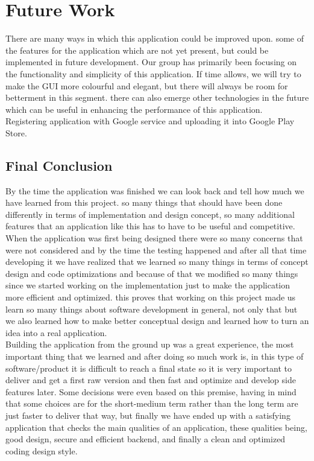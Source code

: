 \section{Future Work}
There are many ways in which this application could be improved upon. some of the features for the application which are not yet present, but could be implemented in future development.
Our group has primarily been focusing on the functionality and simplicity of this application. If time allows, we will try to make the GUI more colourful and elegant, but there will always be room for betterment in this segment. there can also emerge other technologies in the future which can be useful in enhancing the performance of this application.\\
Registering application with Google service and uploading it into Google Play Store.  

\begin{center}
    \section*{\huge{Final Conclusion}}
\end{center}
By the time the application was finished we can look back and tell how much we have learned from this project. so many things that should have been done differently in terms of implementation and design concept, so many additional features that an application like this has to have to be useful and competitive. 
\\ When the application was first being designed there were so many concerns that were not considered and by the time the testing happened and after all that time developing it we have realized that we learned so many things in terms of concept design and code optimizations and because of that we modified so many things since we started working on the implementation just to make the application more efficient and optimized. this proves that working on this project made us learn so many things about software development in general, not only that but we also learned how to make better conceptual design and learned how to turn an idea into a real application.
\\ Building the application from the ground up was a great experience, the most important thing that we learned and after doing so much work is, in this type of software/product it is difficult  to reach a final state so it is very important to deliver and get a first raw version and then fast and optimize and develop side features later. Some decisions were even based on this premise, having in mind that some choices are for the short-medium term rather than the long term are just faster to deliver that way, but finally we have ended up with a satisfying application that checks the main qualities of an application, these qualities being, good design, secure and efficient backend, and finally a clean and optimized coding design style.







